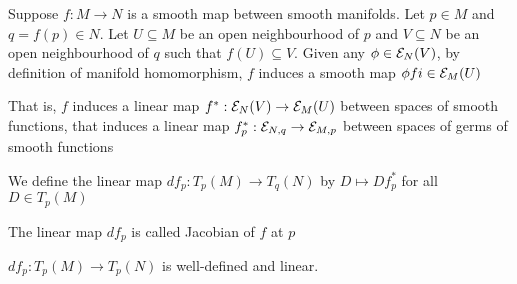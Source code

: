 \begin{remark}
\end{remark}




\begin{definition}[Jacobian]
	Suppose $f: M \to N$ is a smooth map between smooth manifolds. Let $p \in M$ and $q = f(p) \in N$. Let $U \subseteq M$ be an open neighbourhood of $p$ and $V \subseteq N$ be an open neighbourhood of $q$ such that $f(U) \subseteq V$. Given any $\phi \in \mathcal{E}_N(V)$, by definition of manifold homomorphism, $f$ induces a smooth map $\phi f i \in \mathcal{E}_M(U)$
	\begin{center}
	\end{center}
	
	That is, $f$ induces a linear map $f^*: \mathcal{E}_N(V) \to \mathcal{E}_M(U)$ between spaces of smooth functions, that induces a linear map $f^*_p: \mathcal{E}_{N, q} \to \mathcal{E}_{M, p}$ between spaces of germs of smooth functions
	\begin{center}
	\end{center}
	
	We define the linear map $df_p: T_p(M) \to T_q(N)$ by $D \mapsto D f^*_p$ for all $D \in T_p(M)$
	\begin{center}
	\end{center}
	
	The linear map $df_p$ is called Jacobian of $f$ at $p$
\end{definition}

\begin{proposition}
	$df_p: T_p(M) \to T_p(N)$ is well-defined and linear.
\end{proposition}


